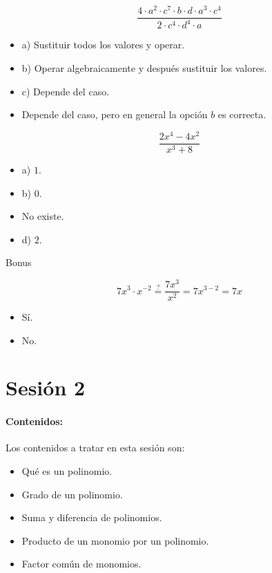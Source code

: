 \[
	\frac{4·a^2·c^7·b·d·a^3·c^4}{2·c^4·d^4·a}
\]

\begin{itemize}
	\item a) Sustituir todos los valores y operar.
	\item b) Operar algebraicamente y después sustituir los valores.
	\item c) Depende del caso.
	\item {} Depende del caso, pero en general la opción $b$ es correcta.
\end{itemize}

\[
	\frac{2x^4-4x^2}{x^3+8}
\]

\begin{itemize}
	\item a) $1$.
	\item b) $0$.
	\item {} No existe.
	\item d) $2$.
\end{itemize}



\newbloq Bonus

\[
	7x^3·x^{-2} \overset{?}{=} \frac{7x^3}{x^2} = 7x^{3-2} = 7x
\]

\begin{itemize}
	\item {} Sí.
	\item No.
\end{itemize}




\section{Sesión 2}\label{app:ses_comp:2}


\paragraph{Contenidos:}
Los contenidos a tratar en esta sesión son:
\begin{itemize}
\item Qué es un polinomio.
\item Grado de un polinomio.
\item Suma y diferencia de polinomios.
\item Producto de un monomio por un polinomio.
\item Factor común de monomios.
\end{itemize}

